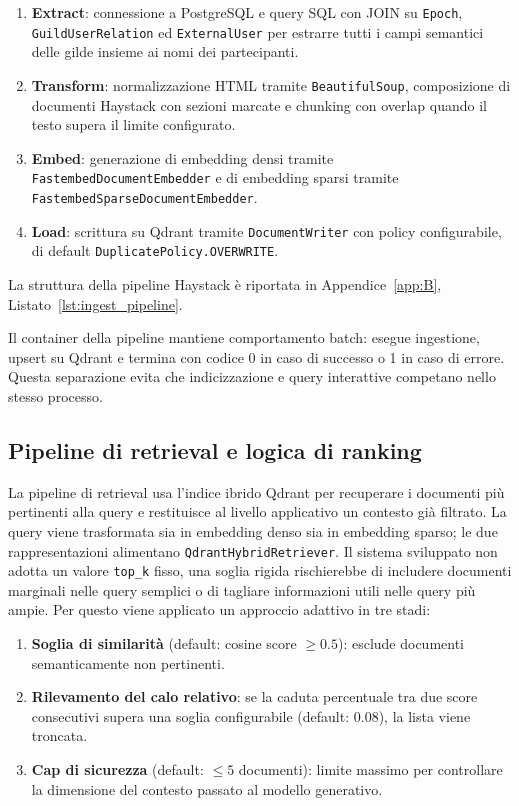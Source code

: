\begin{enumerate}
  \item \textbf{Extract}: connessione a PostgreSQL e query SQL con JOIN su
    \texttt{Epoch}, \texttt{GuildUserRelation} ed \texttt{ExternalUser} per
    estrarre tutti i campi semantici delle gilde insieme ai nomi dei
    partecipanti.
  \item \textbf{Transform}: normalizzazione HTML tramite \texttt{BeautifulSoup},
    composizione di documenti Haystack con sezioni marcate e chunking con
    overlap quando il testo supera il limite configurato.
  \item \textbf{Embed}: generazione di embedding densi tramite
    \texttt{FastembedDocumentEmbedder} e di embedding sparsi tramite
    \texttt{FastembedSparseDocumentEmbedder}.
  \item \textbf{Load}: scrittura su Qdrant tramite \texttt{DocumentWriter} con
    policy configurabile, di default \texttt{DuplicatePolicy.OVERWRITE}.
\end{enumerate}

La struttura della pipeline Haystack è riportata in Appendice~\ref{app:B},
Listato~\ref{lst:ingest_pipeline}.

Il container della pipeline mantiene comportamento batch: esegue ingestione,
upsert su Qdrant e termina con codice 0 in caso di successo o 1 in caso di
errore. Questa separazione evita che indicizzazione e query interattive
competano nello stesso processo.

\subsection{Pipeline di retrieval e logica di ranking}
\label{subsec:retrieval_pipeline}

La pipeline di retrieval usa l'indice ibrido Qdrant per recuperare i documenti
più pertinenti alla query e restituisce al livello applicativo un contesto già
filtrato. La query viene trasformata sia in embedding denso sia in embedding
sparso; le due rappresentazioni alimentano \texttt{QdrantHybridRetriever}. Il
sistema sviluppato non adotta un valore
\texttt{top\_k} fisso, una soglia rigida rischierebbe di includere
documenti marginali nelle query semplici o di tagliare informazioni utili nelle
query più ampie. Per questo viene applicato un approccio adattivo in tre stadi:

\begin{enumerate}
  \item \textbf{Soglia di similarità} (default: cosine score $\geq 0.5$):
    esclude documenti semanticamente non pertinenti.
  \item \textbf{Rilevamento del calo relativo}: se la caduta percentuale tra
    due score consecutivi supera una soglia configurabile (default: 0.08), la
    lista viene troncata.
  \item \textbf{Cap di sicurezza} (default: $\leq 5$ documenti): limite
    massimo per controllare la dimensione del contesto passato al modello
    generativo.
\end{enumerate}

